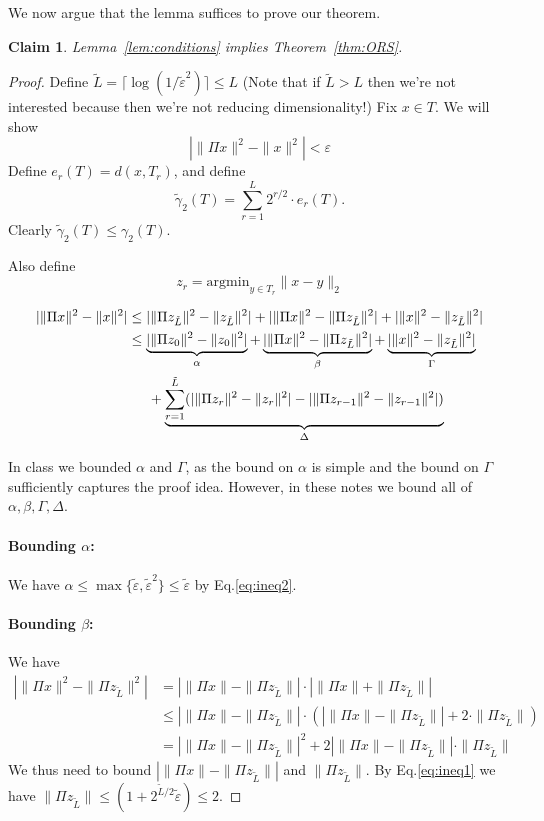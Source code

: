 \documentclass[11pt]{article}
\newtheorem{claim}{Claim}
\newcommand{\teps}{\tilde \varepsilon}
\newcommand{\ep}{\varepsilon}
\newcommand{\EquationName}[1]{\label{eq:#1}}
\newcommand{\Equation}[1]{Eq.\:\eqref{eq:#1}}
\begin{document}
We now argue that the lemma suffices to prove our theorem.
\begin{claim}
Lemma~\ref{lem:conditions} implies Theorem~\ref{thm:ORS}.
\end{claim}
\begin{proof}
Define $\tilde L = \lceil \log(1/\tilde \ep^2) \rceil \leq L$ (Note that if $\tilde L > L$ then we're not interested because then we're not reducing dimensionality!) Fix $x \in T$. We will show
\[
\left| \| \Pi x \|^2 - \|x \|^2 \right| < \ep
\]
Define $e_r(T) = d(x, T_r)$, and define
\[
\tilde{\gamma}_2(T) = \sum_{r=1}^L 2^{r/2}\cdot e_r(T) .
\]
Clearly $\tilde{\gamma}_2(T) \le \gamma_2(T)$.

Also define
\[
z_r = \text{argmin}_{y \in T_r} \|x - y\|_2
\]

\begin{align}
\nonumber |\|\Pi x\|^2 - \|x\|^2| &\le |\|\Pi z_{\tilde{L}}\|^2 - \|z_{\tilde{L}}\|^2| + |\|\Pi x\|^2 - \|\Pi z_{\tilde{L}}\|^2| + | \|x\|^2 - \|z_{\tilde{L}}\|^2 |\\
\nonumber {}&\le \underbrace{|\|\Pi z_0\|^2 - \|z_0\|^2|}_{\alpha} + \underbrace{|\|\Pi x\|^2 - \|\Pi z_{\tilde{L}}\|^2|}_\beta + \underbrace{| \|x\|^2 - \|z_{\tilde{L}}\|^2 |}_\Gamma\\
&\hspace{.2in}{} + \underbrace{\sum_{r=1}^{\tilde{L}} (| \|\Pi z_r\|^2 - \|z_r\|^2| - | \|\Pi z_{r-1}\|^2 - \|z_{r-1}\|^2|)}_\Delta
\end{align}

In class we bounded $\alpha$ and $\Gamma$, as the bound on $\alpha$ is simple and the bound on $\Gamma$ sufficiently captures the proof idea. However, in these notes we bound all of $\alpha, \beta, \Gamma, \Delta$. 

\paragraph{Bounding $\alpha$:} We have $\alpha\le \max\{\teps, \teps^2\} \le \teps$ by \Equation{ineq2}.

\paragraph{Bounding $\beta$:} We have
\begin{align}
\nonumber |\|\Pi x\|^2 - \|\Pi z_{\tilde{L}}\|^2| &= |\|\Pi x\| - \|\Pi z_{\tilde{L}}\|| \cdot |\|\Pi x\| + \|\Pi z_{\tilde{L}}\||\\
\nonumber {}&\le |\|\Pi x\| - \|\Pi z_{\tilde{L}}\|| \cdot \left(|\|\Pi x\| - \|\Pi z_{\tilde{L}}\|| + 2\cdot\|\Pi z_{\tilde{L}}\|\right)\\
{}&= |\|\Pi x\| - \|\Pi z_{\tilde{L}}\||^2 + 2|\|\Pi x\| - \|\Pi z_{\tilde{L}}\||\cdot\|\Pi z_{\tilde{L}}\| \EquationName{boundbeta}
\end{align}
We thus need to bound $|\|\Pi x\| - \|\Pi z_{\tilde{L}}\||$ and $\|\Pi z_{\tilde{L}}\|$. By \Equation{ineq1} we have $\|\Pi z_{\tilde{L}}\| \le (1+2^{\tilde{L}/2}\teps) \le 2$.


\end{proof}
\end{document}
